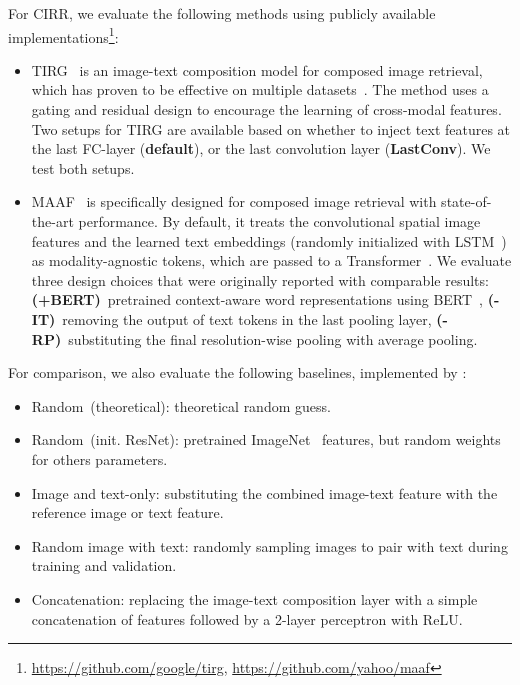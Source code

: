 \documentclass[10pt,twocolumn,letterpaper]{article}
\makeatletter
\renewcommand{\paragraph}{\@startsection{paragraph}{4}{\z@}{1.05ex \@plus 1ex \@minus .2ex}{-1em}{\normalfont\normalsize\bfseries}}
\newcommand{\dstname}{CIRR\xspace}
\makeatother
\begin{document}
\paragraph{Compared methods.}
For \dstname, we evaluate the following methods using publicly available  implementations\footnote{\url{https://github.com/google/tirg}, \url{https://github.com/yahoo/maaf}}:
\begin{itemize}
  \denselist
  \item TIRG~\cite{Vo_2019_tirg} is an image-text composition model for composed image retrieval, which has proven to be effective on multiple datasets~\cite{fashioniq,han2017automatic_fashion200k,Vo_2019_tirg,Isola2015DiscoveringSA_mitstates}. The method uses a gating and residual design to encourage the learning of cross-modal features. Two setups for TIRG are available based on whether to inject text features at the last FC-layer (\textbf{default}), or the last convolution layer (\textbf{LastConv}). We test both setups.
  \item MAAF~\cite{dodds2020modality_maaf} is specifically designed for composed image retrieval with state-of-the-art performance. By default, it treats the convolutional spatial image features and the learned text embeddings (randomly initialized with LSTM~\cite{hochreiter1997long}) as modality-agnostic tokens, which are passed to a Transformer~\cite{vaswani2017attention_transformer}. We evaluate three design choices that were originally reported with comparable results: {\bf (+BERT)}~pretrained context-aware word representations using BERT~\cite{devlin2018bert_bert}, {\bf  (-IT)}~removing the output of text tokens in the last pooling layer, {\bf (-RP)}~substituting the final resolution-wise pooling with average pooling.
\end{itemize}

For comparison, we also evaluate the following baselines, implemented by \citet{Vo_2019_tirg}:
\begin{itemize}
  \denselist
  \item Random~(theoretical): theoretical random guess.
  \item Random~(init. ResNet): pretrained ImageNet~\cite{krizhevsky2012imagenet} features, but random weights for others parameters.
  \item Image and text-only: substituting the combined image-text feature with the reference image or text feature.
  \item Random image with text: randomly sampling images to pair with text during training and validation.
  \item Concatenation: replacing the image-text composition layer with a simple concatenation of features followed by a 2-layer perceptron with ReLU.
\end{itemize}
\end{document}
